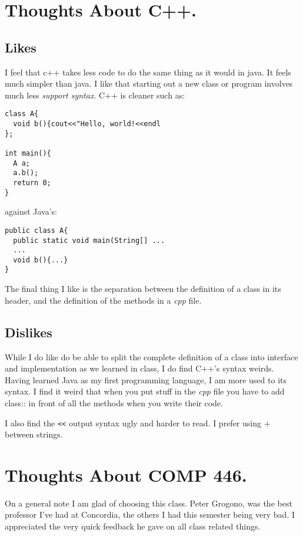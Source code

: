 \documentclass[12pt]{article}
\begin{document}
\section{Thoughts About C++.}
\subsection{Likes}
I feel that c++ takes less code to do the same thing as it would in java.  It feels much simpler than java.  I like that starting out a new class or program involves much less \emph{support syntax}. C++ is cleaner such as:

\begin{verbatim}
class A{
  void b(){cout<<"Hello, world!<<endl
};

int main(){
  A a;
  a.b();
  return 0;
}
\end{verbatim}

against Java's:

\begin{verbatim}
public class A{
  public static void main(String[] ...
  ...
  void b(){...}
}
\end{verbatim}

The final thing I like is the separation between the definition of a class in its header, and the definition of the methods in a \emph{cpp} file.

\subsection{Dislikes}
While I do like do be able to split the complete definition of a class into
interface and implementation as we learned in class, I do find C++'s syntax
weirds.  Having learned Java as my first programming language, I am more used to
its syntax.  I find it weird that when you put stuff in the \emph{cpp} file you
have to add class:: in front of all the methods when you write their code.


I also find the \verb|<<| output syntax ugly and harder to read.  I prefer 
using + between strings.

\section{Thoughts About COMP 446.}

On a general note I am glad of choosing this class.  Peter Grogono, was the
best professor I've had at Concordia, the others I had this semester being very
bad. I appreciated the very quick feedback he gave on all class related things.
\end{document}
